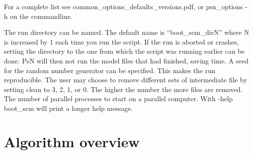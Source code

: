 For a complete list see common\_options\_defaults\_versions.pdf, or psn\_options -h on the commandline.

\begin{optionlist}
The run directory can be named. The default name is “boot\_scm\_dirN” where N is increased by 1 each time you run the script. If the run is aborted or crashes, setting the directory to the one from which the script was running earlier can be done. PsN will then not run the model files that had finished, saving time. 
\nextopt
{}
A seed for the random number generator can be specified. This makes the run reproducible.  
\nextopt
{}
The user may choose to remove different sets of intermediate file by setting clean to 3, 2, 1, or 0. The higher the number the more files are removed. 
\nextopt
{}
The number of parallel processes to start on a parallel computer. 
\nextopt
{}
With -help boot\_scm will print a longer help message. 
\nextopt
\end{optionlist}


\section{Algorithm overview}

